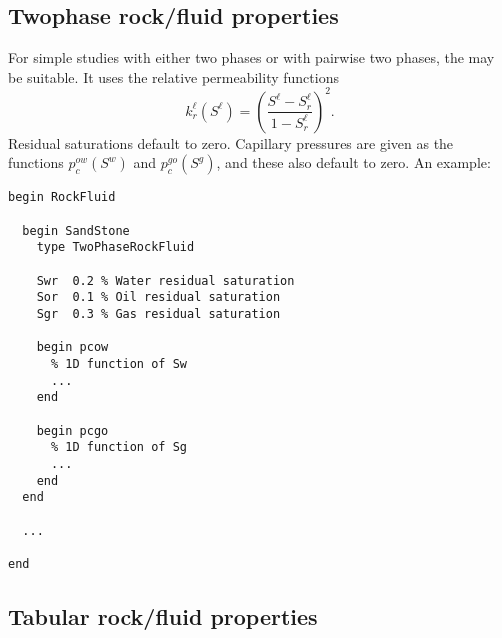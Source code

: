 
\subsection{Twophase rock/fluid properties}

For simple studies with either two phases or with pairwise two phases,
the  may be suitable. It uses the
relative permeability functions
\begin{equation}
  k_r^\ell(S^\ell) = \left(\frac{S^\ell - S_r^\ell}{1-S_r^\ell}\right)^2.
\end{equation}
Residual saturations default to zero. Capillary pressures are given as
the functions $p_c^{ow}(S^w)$ and $p_c^{go}(S^g)$, and these also
default to zero. An example:
\begin{verbatim}
begin RockFluid

  begin SandStone
    type TwoPhaseRockFluid

    Swr  0.2 % Water residual saturation
    Sor  0.1 % Oil residual saturation
    Sgr  0.3 % Gas residual saturation

    begin pcow
      % 1D function of Sw
      ...
    end

    begin pcgo
      % 1D function of Sg
      ...
    end
  end

  ...

end
\end{verbatim}


\subsection{Tabular rock/fluid properties}

